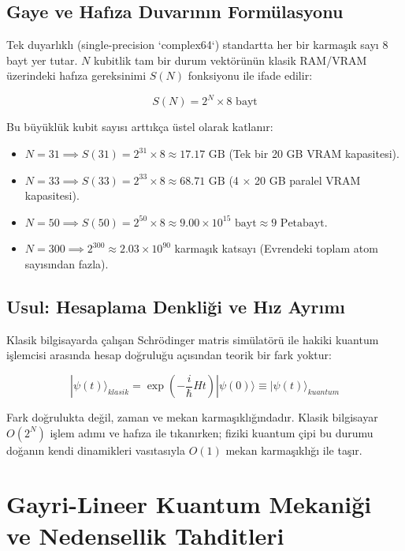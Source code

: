 \documentclass[11pt, a4paper]{article}
\begin{document}
\subsection{Gaye ve Hafıza Duvarının Formülasyonu}
Tek duyarlıklı (single-precision `complex64`) standartta her bir karmaşık sayı 8 bayt yer tutar. $N$ kubitlik tam bir durum vektörünün klasik RAM/VRAM üzerindeki hafıza gereksinimi $S(N)$ fonksiyonu ile ifade edilir:

\begin{equation}
S(N) = 2^N \times 8 \text{ bayt}
\end{equation}

Bu büyüklük kubit sayısı arttıkça üstel olarak katlanır:
\begin{itemize}
    \item $N = 31 \implies S(31) = 2^{31} \times 8 \approx 17.17 \text{ GB}$ (Tek bir 20 GB VRAM kapasitesi).
    \item $N = 33 \implies S(33) = 2^{33} \times 8 \approx 68.71 \text{ GB}$ (4 $\times$ 20 GB paralel VRAM kapasitesi).
    \item $N = 50 \implies S(50) = 2^{50} \times 8 \approx 9.00 \times 10^{15} \text{ bayt} \approx 9 \text{ Petabayt}$.
    \item $N = 300 \implies 2^{300} \approx 2.03 \times 10^{90}$ karmaşık katsayı (Evrendeki toplam atom sayısından fazla).
\end{itemize}

\subsection{Usul: Hesaplama Denkliği ve Hız Ayrımı}
Klasik bilgisayarda çalışan Schrödinger matris simülatörü ile hakiki kuantum işlemcisi arasında hesap doğruluğu açısından teorik bir fark yoktur:

\begin{equation}
|\psi(t)\rangle_{klasik} = \exp\left(-\frac{i}{\hbar} H t\right) |\psi(0)\rangle \equiv |\psi(t)\rangle_{kuantum}
\end{equation}

Fark doğrulukta değil, zaman ve mekan karmaşıklığındadır. Klasik bilgisayar $O(2^N)$ işlem adımı ve hafıza ile tıkanırken; fiziki kuantum çipi bu durumu doğanın kendi dinamikleri vasıtasıyla $O(1)$ mekan karmaşıklığı ile taşır.

\section{Gayri-Lineer Kuantum Mekaniği ve Nedensellik Tahditleri}
\end{document}
